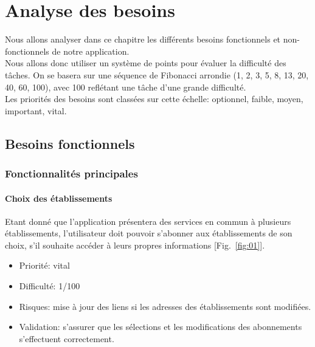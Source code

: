 \chapter{Analyse des besoins}

Nous allons analyser dans ce chapitre les différents besoins fonctionnels et non-fonctionnels de notre application.\\
Nous allons donc utiliser un système de points pour évaluer la difficulté des tâches. On se basera sur une séquence de Fibonacci arrondie (1, 2, 3, 5, 8, 13, 20, 40, 60, 100), avec 100 reflétant une tâche d'une grande difficulté.\\
Les priorités des besoins sont classées sur cette échelle: optionnel, faible, moyen, important, vital.
\section{Besoins fonctionnels}
\subsection{Fonctionnalités principales}
\subsubsection{Choix des établissements}
Etant donné que l'application présentera des services en commun à plusieurs établissements, l'utilisateur doit pouvoir s'abonner aux établissements de son choix, s'il souhaite accéder à leurs propres informations [Fig.~\ref{fig:01}]. \\

\begin{itemize}
\renewcommand{\labelitemi}{$\bullet$}
\item Priorité: vital
\item Difficulté: 1/100
\item Risques: mise à jour des liens si les adresses des établissements sont modifiées.
\item Validation: s'assurer que les sélections et les modifications des abonnements s'effectuent correctement.
\end{itemize}


